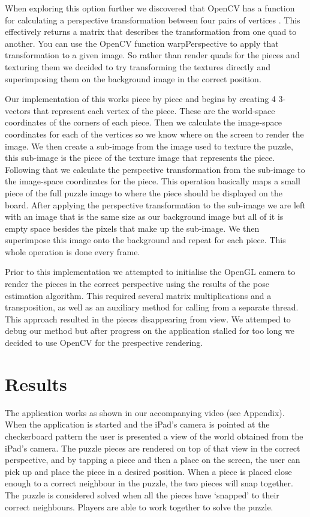 \documentclass{article}
\begin{document}
When exploring this option further we discovered that OpenCV has a function for calculating a perspective transformation between four pairs of vertices \cite{cv_render}. This effectively returns a matrix that describes the transformation from one quad to another. You can use the OpenCV function warpPerspective to apply that transformation to a given image. So rather than render quads for the pieces and texturing them we decided to try transforming the textures directly and superimposing them on the background image in the correct position. 

Our implementation of this works piece by piece and begins by creating 4 3-vectors that represent each vertex of the piece. These are the world-space coordinates of the corners of each piece. Then we calculate the image-space coordinates for each of the vertices so we know where on the screen to render the image. We then create a sub-image from the image used to texture the puzzle, this sub-image is the piece of the texture image that represents the piece. Following that we calculate the perspective transformation from the sub-image to the image-space coordinates for the piece. This operation basically maps a small piece of the full puzzle image to where the piece should be displayed on the board. After applying the perspective transformation to the sub-image we are left with an image that is the same size as our background image but all of it is empty space besides the pixels that make up the sub-image. We then superimpose this image onto the background and repeat for each piece. This whole operation is done every frame. 

Prior to this implementation we attempted to initialise the OpenGL camera to render the pieces in the correct perspective using the results of the pose estimation algorithm. This required several matrix multiplications and a transposition, as well as an auxiliary method for calling from a separate thread. This approach resulted in the pieces disappearing from view. We attemped to debug our method but after progress on the application stalled for too long we decided to use OpenCV for the prespective rendering. 

\section{Results}

The application works as shown in our accompanying video (see Appendix). When the application is started and the iPad's camera is pointed at the checkerboard pattern the user is presented a view of the world obtained from the iPad's camera. The puzzle pieces are rendered on top of that view in the correct perspective, and by tapping a piece and then a place on the screen, the user can pick up and place the piece in a desired position. When a piece is placed close enough to a correct neighbour in the puzzle, the two pieces will snap together. The puzzle is considered solved when all the pieces have `snapped' to their correct neighbours. Players are able to work together to solve the puzzle. 
\end{document}
